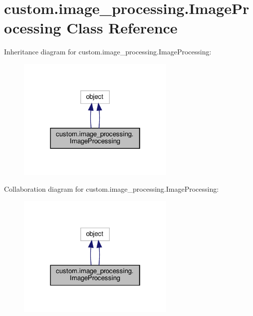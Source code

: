 \hypertarget{classcustom_1_1image__processing_1_1ImageProcessing}{}\section{custom.\+image\+\_\+processing.\+Image\+Processing Class Reference}
\label{classcustom_1_1image__processing_1_1ImageProcessing}


Inheritance diagram for custom.\+image\+\_\+processing.\+Image\+Processing\+:
\nopagebreak
\begin{figure}[H]
\begin{center}
\leavevmode
\includegraphics[width=214pt]{classcustom_1_1image__processing_1_1ImageProcessing__inherit__graph}
\end{center}
\end{figure}


Collaboration diagram for custom.\+image\+\_\+processing.\+Image\+Processing\+:
\nopagebreak
\begin{figure}[H]
\begin{center}
\leavevmode
\includegraphics[width=214pt]{classcustom_1_1image__processing_1_1ImageProcessing__coll__graph}
\end{center}
\end{figure}
